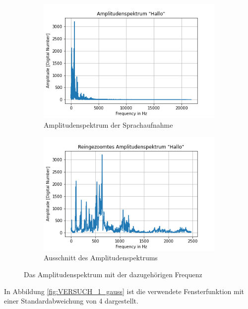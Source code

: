 \documentclass[12pt, oneside, a4paper, \docLanguage]{report}
\begin{document}
\begin{figure}[H]
\centering
	\begin{subfigure}{.5\textwidth}
  		\centering
 		 \includegraphics[width=.95\linewidth]{media/AmplitudenspektrumBreit.png}
  		\caption{Amplitudenspektrum der Sprachaufnahme}
 		 \label{fig:VERSUCH_1_sub1}
	\end{subfigure}%
	\begin{subfigure}{.5\textwidth}
  		\centering
 		 \includegraphics[width=.95\linewidth]{media/AmplitudenspektrumSchmal.png}
  		\caption{Ausschnitt des Amplitudenspektrums}
  		\label{fig:VERSUCH_1_sub2}
	\end{subfigure}
	\caption{Das Amplitudenspektrum mit der dazugehörigen Frequenz}
	\label{fig:VERSUCH_1_test}
\end{figure}

In Abbildung \ref{fig:VERSUCH_1_gauss} ist die verwendete Fensterfunktion mit einer Standardabweichung von 4 dargestellt.
\end{document}
